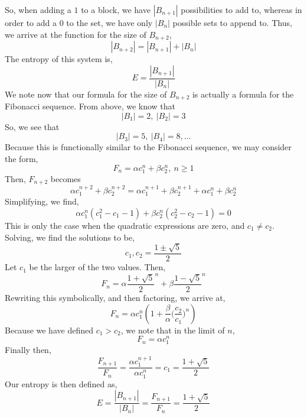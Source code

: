 \documentclass[letterpaper,10pt]{article}
\begin{document}
\begin{enumerate}
\begin{enumerate}
So, when adding a $1$ to a block, we have $|B_{n+1}|$ possibilities to add to, whereas in order to add a $0$ to the set, we have only $|B_n|$ possible sets to append to. Thus, we arrive at the function for the size of $B_{n+2}$,
\[|B_{n+2}|=|B_{n+1}|+|B_{n}|\]
The entropy of this system is,
\[E=\frac{|B_{n+1}|}{|B_n|}\]
We note now that our formula for the size of $B_{n+2}$ is actually a formula for the Fibonacci sequence. From above, we know that 
\[|B_1|=2,\ |B_2|=3\]
So, we see that
\[|B_3|=5,\ |B_4|=8, \ldots\]
Because this is functionally similar to the Fibonacci sequence, we may consider the form,
\[F_n=\alpha c_1^n+\beta c_2^n,\ n\geq 1\]
Then, $F_{n+2}$ becomes
\[\alpha c_1^{n+2}+\beta c_2^{n+2}=\alpha c_1^{n+1}+\beta c_2^{n+1}+\alpha c_1^{n}+\beta c_2^{n}\]
Simplifying, we find, 
\[\alpha c_1^n(c_1^2-c_1-1)+\beta c_2^n(c_2^2-c_2-1)=0\]
This is only the case when the quadratic expressions are zero, and $c_1\neq c_2$. Solving, we find the solutions to be,
\[c_1,c_2=\frac{1\pm \sqrt{5}}{2}\]
Let $c_1$ be the larger of the two values. Then,
\[F_n=\alpha \frac{1+\sqrt{5}}{2}^n+\beta \frac{1-\sqrt{5}}{2}^n\]
Rewriting this symbolically, and then factoring, we arrive at,
\[F_n=\alpha c_1^n(1+\frac{\beta}{\alpha}\bigg(\frac{c_2}{c_1}\bigg)^n)\]
Because we have defined $c_1>c_2$, we note that in the limit of $n$, 
\[F_n=\alpha c_1^n\]
Finally then,
\[\frac{F_{n+1}}{F_n}=\frac{\alpha c_1^{n+1}}{\alpha c_1^n}=c_1=\frac{1+\sqrt{5}}{2}\]
Our entropy is then defined as,
\[E=\frac{|B_{n+1}|}{|B_n|}=\frac{F_{n+1}}{F_n}=\frac{1+\sqrt{5}}{2}\]
\end{enumerate}
\end{enumerate}
\end{document}
